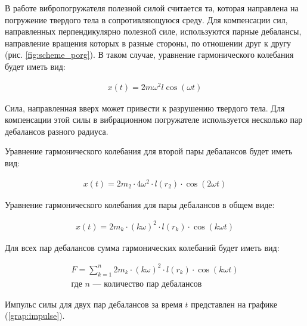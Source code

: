 В работе вибропогружателя полезной силой считается та, которая направлена на погружение твердого тела в сопротивляющуюся среду. Для компенсации сил, направленных перпендикулярно полезной силе, используются парные дебалансы, направление вращения которых в разные стороны, по отношении друг к другу (рис. \ref{fig:scheme_porg}). В таком случае, уравнение гармонического колебания будет иметь вид:

\begin{equation}\label{eq:harmonic_dual}
    \begin{aligned}
        x(t) = 2 m \omega^2 l \cos (\omega t)
    \end{aligned}
\end{equation}

Сила, направленная вверх может привести к разрушению твердого тела. Для компенсации этой силы в вибрационном погружателе используется несколько пар дебалансов разного радиуса.

Уравнение гармонического колебания для второй пары дебалансов будет иметь вид:

\begin{equation*}
    \begin{aligned}
        x(t) = 2 m_2 \cdot 4 \omega^2 \cdot l(r_2) \cdot \cos (2 \omega t)
    \end{aligned}
\end{equation*}

Уравнение гармонического колебания для пары дебалансов в общем виде:

\begin{equation}\label{eq:harmonic_common}
    \begin{aligned}
        x(t) = 2 m_k \cdot (k \omega)^2 \cdot l(r_k) \cdot \cos (k \omega t)
    \end{aligned}
\end{equation}

Для всех пар дебалансов сумма гармонических колебаний будет иметь вид:

\begin{equation}\label{eq:harmonic_sum}
    \begin{gathered}
        F = \sum_{k = 1}^{n} 2 m_k \cdot (k \omega)^2 \cdot l(r_k) \cdot \cos (k \omega t) \\
        \textrm{где $n$ --- количество пар дебалансов} 
    \end{gathered}
\end{equation}

Импульс силы для двух пар дебалансов за время $t$ представлен на графике (\ref{grap:impulse}).

